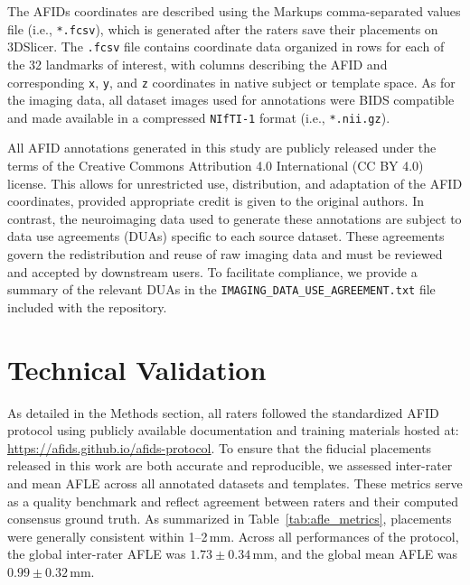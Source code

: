 The AFIDs coordinates are described using the Markups comma-separated values file (i.e., \texttt{*.fcsv}), which is generated after the raters save their placements on 3DSlicer. The \texttt{.fcsv} file contains coordinate data organized in rows for each of the 32 landmarks of interest, with columns describing the AFID and corresponding \texttt{x}, \texttt{y}, and \texttt{z} coordinates in native subject or template space. As for the imaging data, all dataset images used for annotations were BIDS compatible and made available in a compressed \texttt{NIfTI-1} format (i.e., \texttt{*.nii.gz}).

All AFID annotations generated in this study are publicly released under the terms of the Creative Commons Attribution 4.0 International (CC BY 4.0) license. This allows for unrestricted use, distribution, and adaptation of the AFID coordinates, provided appropriate credit is given to the original authors. In contrast, the neuroimaging data used to generate these annotations are subject to data use agreements (DUAs) specific to each source dataset. These agreements govern the redistribution and reuse of raw imaging data and must be reviewed and accepted by downstream users. To facilitate compliance, we provide a summary of the relevant DUAs in the \texttt{IMAGING\_DATA\_USE\_AGREEMENT.txt} file included with the repository.


\section{Technical Validation}
As detailed in the Methods section, all raters followed the standardized AFID protocol using publicly available documentation and training materials hosted at: \url{https://afids.github.io/afids-protocol}. To ensure that the fiducial placements released in this work are both accurate and reproducible, we assessed inter-rater and mean AFLE across all annotated datasets and templates. These metrics serve as a quality benchmark and reflect agreement between raters and their computed consensus ground truth. As summarized in Table~\ref{tab:afle_metrics}, placements were generally consistent within 1–2\,mm. Across all performances of the protocol, the global inter-rater AFLE was $1.73 \pm 0.34$\,mm, and the global mean AFLE was $0.99 \pm 0.32$\,mm.

